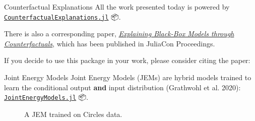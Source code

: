 \documentclass[
  ignorenonframetext,
]{beamer}
\theoremstyle{definition}
\theoremstyle{remark}
\begin{document}
\begin{frame}[fragile]{Counterfactual Explanations}
\label{counterfactual-explanations}
All the work presented today is powered by
\href{https://github.com/JuliaTrustworthyAI/CounterfactualExplanations.jl}{\texttt{CounterfactualExplanations.jl}}
📦.

There is also a corresponding paper,
\href{https://proceedings.juliacon.org/papers/10.21105/jcon.00130}{\emph{Explaining
Black-Box Models through Counterfactuals}}, which has been published in
JuliaCon Proceedings.

If you decide to use this package in your work, please consider citing
the paper:

\href{https://doi.org/10.21105/jcon.00130}{}
\href{https://zenodo.org/badge/latestdoi/440782065}{}
\end{frame}

\begin{frame}[fragile]{Joint Energy Models}
\label{joint-energy-models}
Joint Energy Models (JEMs) are hybrid models trained to learn the
conditional output \textbf{and} input distribution (Grathwohl et al.
2020):
\href{https://github.com/JuliaTrustworthyAI/JointEnergyModels.jl}{\texttt{JointEnergyModels.jl}}
📦.

\begin{figure}


\caption{\label{fig-jem}A JEM trained on Circles data.}

\end{figure}%
\end{frame}
\end{document}
